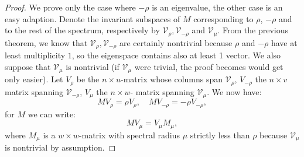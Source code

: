 \documentclass[a4paper,11pt]{report}
\begin{document}
\begin{proof}
  We prove only the case where $-\rho$ is an eigenvalue, the other case is an 
  easy adaption. Denote the invariant subspaces of $M$ corresponding to $\rho$, 
  $-\rho$ and to the rest of the spectrum, respectively by $\mathcal{V}_\rho, \mathcal{V}_{-\rho}$ 
  and $\mathcal{V}_\mu$. From the previous theorem, we know that $\mathcal{V}_\rho, \mathcal{V}_{-\rho}$  
  are certainly nontrivial because $\rho$ and $-\rho$ have at least multiplicity $1$, so the eigenspace contains also at least
  1 vector. We also suppose that $\mathcal{V}_\mu$ is nontrivial (if $\mathcal{V}_\mu$ were trivial, the proof
  becomes would get only easier). Let $V_\rho$ be the $n \times u$-matrix whose columns span $\mathcal{V}_\rho$,
  $V_{-\rho}$ the $n \times v$ matrix spanning $\mathcal{V}_{-\rho}$, $V_{\mu}$ the $n \times w$- matrix spanning $\mathcal{V}_{\mu}$. We now have:
  $$MV_\rho = \rho V_\rho, \quad MV_{-\rho} = -\rho V_{-\rho},$$
  for $M$ we can write:
  $$MV_\mu = V_\mu M_\mu,$$
  where $M_\mu$ is a $w \times w$-matrix with spectral radius $\mu$ strictly less than $\rho$ because 
  $\mathcal{V}_\mu$ is nontrivial by assumption. 
  

\end{proof}
\end{document}

